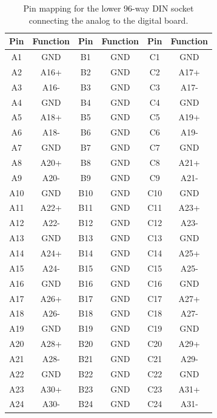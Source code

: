 \documentclass[a4paper]{article}
\begin{document}
\begin{table}[h]
    \begin{center}
        \caption{Pin mapping for the lower 96-way DIN socket connecting the analog to the digital board.}
        \label{tab:DIN96Lower}
        \begin{tabular}{cc|cc|cc}
            \hline
            \hline
            Pin & Function & Pin & Function & Pin & Function \\
            \hline
            A1 & GND & B1 & GND & C1 & GND \\
            A2 & A16+ & B2 & GND & C2 & A17+ \\
            A3 & A16- & B3 & GND & C3 & A17- \\
            A4 & GND & B4 & GND & C4 & GND \\
            A5 & A18+ & B5 & GND & C5 & A19+ \\
            A6 & A18- & B6 & GND & C6 & A19- \\
            A7 & GND & B7 & GND & C7 & GND \\
            A8 & A20+ & B8 & GND & C8 & A21+ \\
            A9 & A20- & B9 & GND & C9 & A21- \\
            A10 & GND & B10 & GND & C10 & GND \\
            A11 & A22+ & B11 & GND & C11 & A23+ \\
            A12 & A22- & B12 & GND & C12 & A23- \\
            A13 & GND & B13 & GND & C13 & GND \\
            A14 & A24+ & B14 & GND & C14 & A25+ \\
            A15 & A24- & B15 & GND & C15 & A25- \\
            A16 & GND & B16 & GND & C16 & GND \\
            A17 & A26+ & B17 & GND & C17 & A27+ \\
            A18 & A26- & B18 & GND & C18 & A27- \\
            A19 & GND & B19 & GND & C19 & GND \\
            A20 & A28+ & B20 & GND & C20 & A29+ \\
            A21 & A28- & B21 & GND & C21 & A29- \\
            A22 & GND & B22 & GND & C22 & GND \\
            A23 & A30+ & B23 & GND & C23 & A31+ \\
            A24 & A30- & B24 & GND & C24 & A31- \\

\end{tabular}
\end{center}
\end{table}
\end{document}
